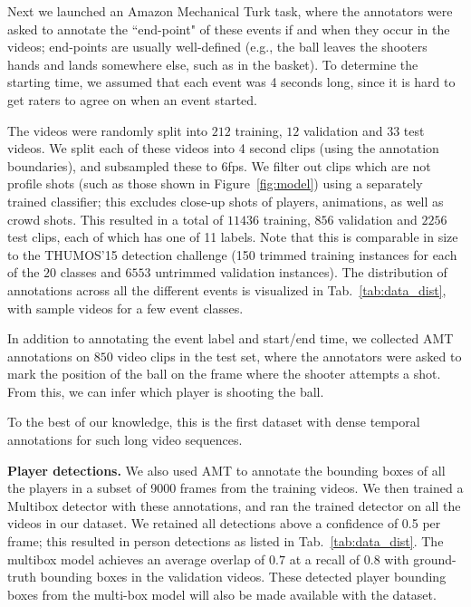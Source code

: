 Next we launched an Amazon Mechanical Turk task, where the
annotators were asked to annotate the ``end-point" of these events if and when
they occur in the videos; end-points are usually well-defined (e.g.,
the ball leaves the shooters hands and lands somewhere else, such as
in the basket).
To determine the starting time, we assumed that each event was 4
seconds long, since it is hard to get raters to agree on when an event
started. 

The videos were randomly split into $212$ training, $12$ validation and $33$
test videos. 
We split each of these videos into 4 second clips (using the
annotation boundaries), and subsampled these to 6fps.
We filter out clips which are not profile shots (such as those shown in
Figure~\ref{fig:model}) using a separately trained classifier; this excludes close-up shots of players, animations, as
well as crowd shots. 
This resulted in a total of $11436$ training, $856$ validation
and $2256$ test clips, each of which has one of 11 labels.
Note that this is comparable in size to the THUMOS'15 detection
challenge (150 trimmed training instances for each of the $20$ classes and $6553$
untrimmed validation instances). The distribution of annotations across all the
different events is visualized in Tab.~\ref{tab:data_dist}, with sample videos
for a few event classes. 

In addition to annotating the event label and start/end time,
we collected AMT annotations on $850$ video clips in the test
set, where the annotators were asked to mark the position of the ball
on the frame where the shooter attempts a shot.
From this, we can infer which player is shooting the ball.

To the best of our
knowledge, this is the first dataset with dense temporal annotations for
such long video sequences.

\noindent \textbf{Player detections.}
We also used AMT to annotate the bounding boxes of all the players in a
subset of 9000 frames from the training videos.
We then trained a Multibox detector \cite{Szegedy_arxiv14}
with these annotations, and ran the trained detector on all the videos in our dataset.
We retained all detections above a confidence of 0.5 per frame;
this resulted in person detections as listed in Tab.~\ref{tab:data_dist}.
The multibox model achieves an average overlap of $0.7$ at a recall of $0.8$
with ground-truth bounding boxes in the validation videos.
These detected player bounding boxes from the
multi-box model will also be made available with the dataset. 
